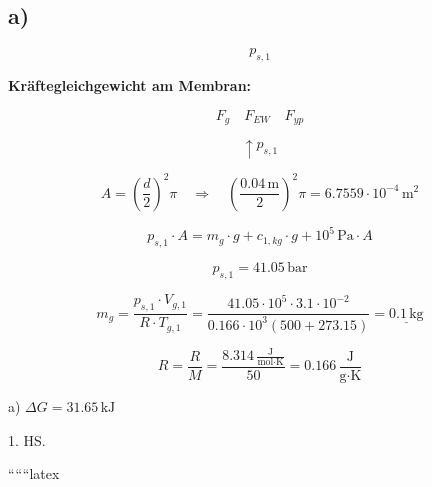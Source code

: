 

\subsection*{a)}

\[
p_{s,1}
\]

\textbf{Kräftegleichgewicht am Membran:}

\[
F_g \quad F_{EW} \quad F_{yp}
\]

\[
\uparrow p_{s,1}
\]

\[
A = \left(\frac{d}{2}\right)^2 \pi \quad \Rightarrow \quad \left(\frac{0.04 \, \text{m}}{2}\right)^2 \pi = 6.7559 \cdot 10^{-4} \, \text{m}^2
\]

\[
p_{s,1} \cdot A = m_g \cdot g + c_{1,kg} \cdot g + 10^5 \, \text{Pa} \cdot A
\]

\[
p_{s,1} = 41.05 \, \text{bar}
\]

\[
m_g = \frac{p_{s,1} \cdot V_{g,1}}{R \cdot T_{g,1}} = \frac{41.05 \cdot 10^5 \cdot 3.1 \cdot 10^{-2}}{0.166 \cdot 10^3 \left(500 + 273.15\right)} = \underline{0.1 \, \text{kg}}
\]

\[
R = \frac{R}{M} = \frac{8.314 \, \frac{\text{J}}{\text{mol} \cdot \text{K}}}{50} = 0.166 \, \frac{\text{J}}{\text{g} \cdot \text{K}}
\]

a) \(\Delta G = 31.65 \, \text{kJ}\)

1. HS.

``````latex